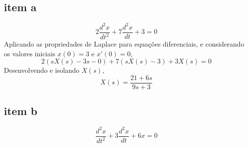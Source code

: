 \documentclass[paper=a4, fontsize=11pt]{article}
\begin{document}
\subsection{item a}
\begin{equation}
    2 \frac{d^2 x}{d t^2} + 7 \frac{d^2 x}{d t} + 3 = 0
\end{equation}
Aplicando as propriedades de Laplace para equações diferenciais, e considerando
os valores iniciais $x(0)=3$ e $x'(0)=0$,
\begin{equation}
    2(s X(s) - 3 s - 0) + 7(s X(s) - 3) +  3 X(s) = 0
\end{equation}
Desenvolvendo e isolando $X(s)$,
\begin{equation}
    X(s) = \frac{21 + 6 s}{9 s + 3}
\end{equation}

\subsection{item b}
\begin{equation}
   \frac{d^2 x}{d t^2} + 3 \frac{d^2 x}{d t} + 6 x = 0
\end{equation}
\end{document}
